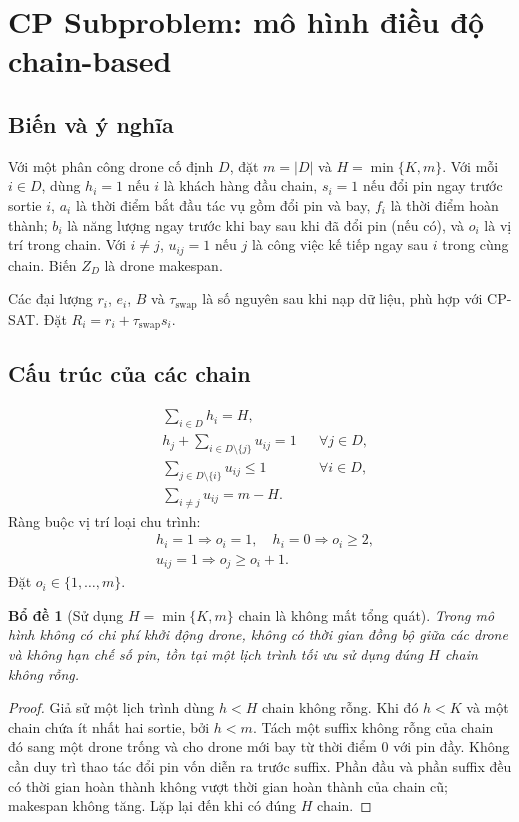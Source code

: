 \documentclass[11pt,a4paper]{article}
\theoremstyle{definition}
\theoremstyle{plain}
\newtheorem{lemma}{Bổ đề}[section]
\theoremstyle{remark}
\newcommand{\sw}{\tau_{\mathrm{swap}}}
\begin{document}
\section{CP Subproblem: mô hình điều độ chain-based}
\label{sec:cp-explicit}
\subsection{Biến và ý nghĩa}
Với một phân công drone cố định $D$, đặt $m=|D|$ và $H=\min\{K,m\}$. Với mỗi $i\in D$, dùng $h_i=1$ nếu $i$ là khách hàng đầu chain, $s_i=1$ nếu đổi pin ngay trước sortie $i$, $a_i$ là thời điểm bắt đầu tác vụ gồm đổi pin và bay, $f_i$ là thời điểm hoàn thành; $b_i$ là năng lượng ngay trước khi bay sau khi đã đổi pin (nếu có), và $o_i$ là vị trí trong chain. Với $i\ne j$, $u_{ij}=1$ nếu $j$ là công việc kế tiếp ngay sau $i$ trong cùng chain. Biến $Z_D$ là drone makespan.

Các đại lượng $r_i$, $e_i$, $B$ và $\sw$ là số nguyên sau khi nạp dữ liệu, phù hợp với CP-SAT. Đặt $R_i=r_i+\sw s_i$.

\subsection{Cấu trúc của các chain}
\begin{align}
&\sum_{i\in D}h_i=H,&&\label{eq:cp-head}\tag{CP1}\\
&h_j+\sum_{i\in D\setminus\{j\}}u_{ij}=1 &&\forall j\in D,\label{eq:cp-pred}\tag{CP2}\\
&\sum_{j\in D\setminus\{i\}}u_{ij}\le1 &&\forall i\in D,\label{eq:cp-succ}\tag{CP3}\\
&\sum_{i\ne j}u_{ij}=m-H.&&\label{eq:cp-arcs}\tag{CP4}
\end{align}
Ràng buộc vị trí loại chu trình:
\begin{align}
&h_i=1\Rightarrow o_i=1,\quad h_i=0\Rightarrow o_i\ge2,\label{eq:cp-headorder}\\
&u_{ij}=1\Rightarrow o_j\ge o_i+1.\label{eq:cp-order}
\end{align}
Đặt $o_i\in\{1,\ldots,m\}$.

\begin{lemma}[Sử dụng $H=\min\{K,m\}$ chain là không mất tổng quát]
Trong mô hình không có chi phí khởi động drone, không có thời gian đồng bộ giữa các drone và không hạn chế số pin, tồn tại một lịch trình tối ưu sử dụng đúng $H$ chain không rỗng.
\end{lemma}
\begin{proof}
Giả sử một lịch trình dùng $h<H$ chain không rỗng. Khi đó $h<K$ và một chain chứa ít nhất hai sortie, bởi $h<m$. Tách một suffix không rỗng của chain đó sang một drone trống và cho drone mới bay từ thời điểm $0$ với pin đầy. Không cần duy trì thao tác đổi pin vốn diễn ra trước suffix. Phần đầu và phần suffix đều có thời gian hoàn thành không vượt thời gian hoàn thành của chain cũ; makespan không tăng. Lặp lại đến khi có đúng $H$ chain.\end{proof}
\end{document}
